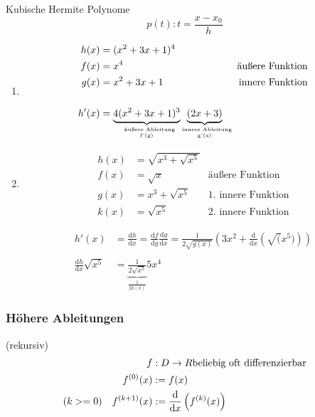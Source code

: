 \begin{example}
	Kubische Hermite Polynome
	\begin{equation*}
		p(t): t = \frac{x-x_0}{h}
	\end{equation*}
	
	\begin{enumerate}
		\item
		\begin{align*}
			h(x) &= (x^2 + 3x + 1)^4\\
			f(x) &= x^4 &\text{äußere Funktion} \\
			g(x) &= x^2 + 3x + 1 &\text{innere Funktion} \\
			\\
			h'(x) &= \underbrace{4 (x^2 + 3x + 1)^3}_{\parbox{16mm}{\centering\tiny \text{äußere Ableitung} f'(g)}} \underbrace{(2x + 3)}_{\parbox{16mm}{\centering\tiny \text{innere Ableitung} g'(x)}}
		\end{align*}
		
		\item
		\begin{align*}
			h(x) &= \sqrt{x^3 + \sqrt{x^5}} \\
			f(x) &= \sqrt{x} & \text{äußere Funktion}\\
			g(x) &= x^3 + \sqrt{x^5} & \text{1. innere Funktion} \\
			k(x) &= \sqrt{x^5} & \text{2. innere Funktion}
		\end{align*}
		
		\begin{align*}
			h'(x) &= \frac{\mathrm dh}{\mathrm dx} = 
			\frac{\mathrm df}{\mathrm dg}\frac{\mathrm dg}{\mathrm dx} =
			\frac{1}{2\sqrt{g(x)}} \left( 3x^2 + \frac{\mathrm d}{\mathrm dx} \left( \sqrt(x^5) \right)\right) \\
			\\
			\frac{\mathrm dh}{\mathrm dx} \sqrt{x^5} &= \underbrace{\frac{1}{2\sqrt{x^5}}}_{\frac{1}{2k(x)}} 5x^4
		\end{align*}
	\end{enumerate}
\end{example}

\subsubsection*{Höhere Ableitungen}
\begin{definition}
	(rekursiv)
	\begin{align*}
		f&: D \rightarrow R \text{beliebig oft differenzierbar} \\
		f^{(0)}(x) &:= f(x) \\
		(k >= 0) \hspace{10px} f^{(k+1)}(x) &:= \frac{\mathrm d}{\mathrm dx} \left( f^{(k)}(x) \right)
	\end{align*}
\end{definition}
	
